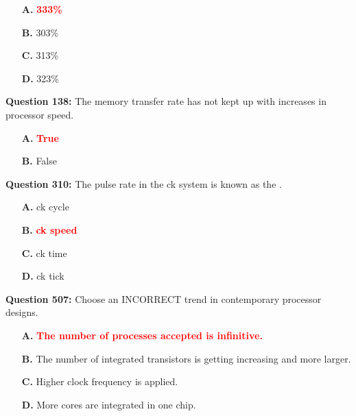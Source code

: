 \documentclass[12pt,a4paper]{article}
\begin{document}
\begin{itemize}
    \item[\textbf{A.}] \textcolor{red}{\textbf{333\%}}
    \item[\textbf{B.}] 303\%
    \item[\textbf{C.}] 313\%
    \item[\textbf{D.}] 323\%
\end{itemize}

\vspace{0.5cm}

\vspace{0.5cm}

\textbf{Question 138:} The memory transfer rate has not kept up with increases in processor speed.

\begin{itemize}
    \item[\textbf{A.}] \textcolor{red}{\textbf{True}}
    \item[\textbf{B.}] False
\end{itemize}

\vspace{0.5cm}

\vspace{0.5cm}

\textbf{Question 310:} The pulse rate in the ck system is known as the \underline{\hspace{1.5cm}}.

\begin{itemize}
    \item[\textbf{A.}] ck cycle
    \item[\textbf{B.}] \textcolor{red}{\textbf{ck speed}}
    \item[\textbf{C.}] ck time
    \item[\textbf{D.}] ck tick
\end{itemize}

\vspace{0.5cm}

\vspace{0.5cm}

\textbf{Question 507:} Choose an INCORRECT trend in contemporary processor designs.

\begin{itemize}
    \item[\textbf{A.}] \textcolor{red}{\textbf{The number of processes accepted is infinitive.}}
    \item[\textbf{B.}] The number of integrated transistors is getting increasing and more larger.
    \item[\textbf{C.}] Higher clock frequency is applied.
    \item[\textbf{D.}] More cores are integrated in one chip.
\end{itemize}
\end{document}
